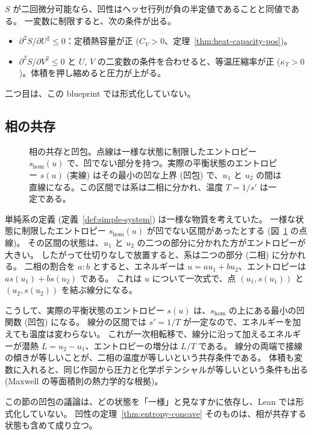 $S$ が二回微分可能なら、凹性はヘッセ行列が負の半定値であることと同値である。
一変数に制限すると、次の条件が出る。
\begin{itemize}
  \item $\partial^2 S/\partial U^2 \le 0$：定積熱容量が正 ($C_V > 0$、定理~\ref{thm:heat-capacity-pos})。
  \item $\partial^2 S/\partial V^2 \le 0$ と $U$, $V$ の二変数の条件を合わせると、等温圧縮率が正 ($\kappa_T > 0$)。体積を押し縮めると圧力が上がる。
\end{itemize}
二つ目は、この blueprint では形式化していない。

\subsection{相の共存}

\begin{figure}[htbp]
  \centering
  \caption{相の共存と凹包。点線は一様な状態に制限したエントロピー $s_{\mathrm{hom}}(u)$ で、凹でない部分を持つ。実際の平衡状態のエントロピー $s(u)$ (実線) はその最小の凹な上界 (凹包) で、$u_1$ と $u_2$ の間は直線になる。この区間では系は二相に分かれ、温度 $T = 1/s'$ は一定である。}
  \label{fig:concave}
\end{figure}

単純系の定義 (定義~\ref{def:simple-system}) は一様な物質を考えていた。
一様な状態に制限したエントロピー $s_{\mathrm{hom}}(u)$ が凹でない区間があったとする (図~\ref{fig:concave} の点線)。
その区間の状態は、$u_1$ と $u_2$ の二つの部分に分かれた方がエントロピーが大きい。
したがって仕切りなしで放置すると、系は二つの部分 (二相) に分かれる。
二相の割合を $a : b$ とすると、エネルギーは $u = a u_1 + b u_2$、エントロピーは $a s(u_1) + b s(u_2)$ である。
これは $u$ について一次式で、点 $(u_1, s(u_1))$ と $(u_2, s(u_2))$ を結ぶ線分になる。

こうして、実際の平衡状態のエントロピー $s(u)$ は、$s_{\mathrm{hom}}$ の上にある最小の凹関数 (凹包) になる。
線分の区間では $s' = 1/T$ が一定なので、エネルギーを加えても温度は変わらない。
これが一次相転移で、線分に沿って加えるエネルギーが潜熱 $L = u_2 - u_1$、エントロピーの増分は $L/T$ である。
線分の両端で接線の傾きが等しいことが、二相の温度が等しいという共存条件である。
体積も変数に入れると、同じ作図から圧力と化学ポテンシャルが等しいという条件も出る (Maxwell の等面積則の熱力学的な根拠)。

この節の凹包の議論は、どの状態を「一様」と見なすかに依存し、Lean では形式化していない。
凹性の定理~\ref{thm:entropy-concave} そのものは、相が共存する状態も含めて成り立つ。

